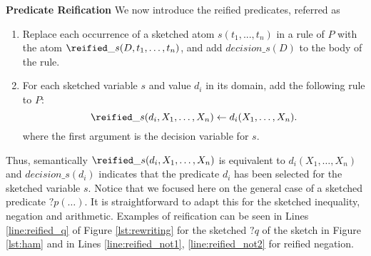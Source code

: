 \vspace{3pt}
\textbf{Predicate Reification} 
We now introduce the reified predicates, referred as \metar
\begin{enumerate}
\item
Replace each occurrence of a sketched atom $s(t_1,...,t_n)$ in a rule of $P$ with the atom $\reified\_s( D, t_1, \dots, t_n)$, 
and add $\textit{decision}\_s(D)$ to the body of the rule.
\item
For each sketched variable $s$ and value $d_i$ in its domain, add the following rule to $P$: %
$$\reified\_s(d_i,X_1, \dots, X_n) \leftarrow d_i(X_1, \dots, X_n).$$
where the first argument is the decision variable for $s$.
\end{enumerate}
Thus, semantically $\reified\_s(d_i,X_1, \dots, X_n)$ is equivalent to $d_i(X_1, \dots, X_n)$  
and $\textit{decision}\_s(d_i)$ indicates that the predicate $d_i$ has been selected for the sketched variable $s$.
Notice that we focused here on the general case of a sketched predicate ${?}p(\dots)$. 
It is straightforward to adapt this for 
the sketched inequality, negation and arithmetic. Examples of reification can be seen in Lines \ref{line:reified_q} of Figure \ref{lst:rewriting} for the sketched ${?}q$ of the sketch in Figure \ref{lst:ham} and in Lines \ref{line:reified_not1}, \ref{line:reified_not2} for reified negation.

